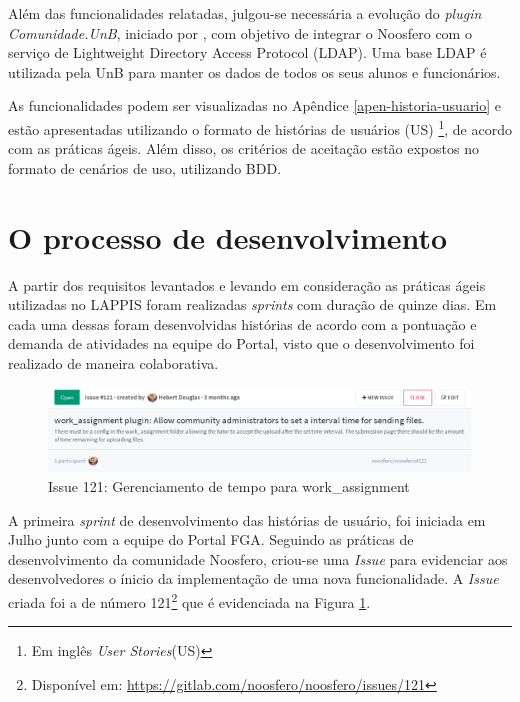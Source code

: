 Além das funcionalidades relatadas, julgou-se necessária a evolução do \textit{plugin Comunidade.UnB}, iniciado por , com objetivo de integrar o Noosfero com o serviço de Lightweight Directory Access Protocol (LDAP). Uma base LDAP é utilizada pela UnB para manter os dados de todos os seus alunos e funcionários.

As funcionalidades podem ser visualizadas no Apêndice \ref{apen-historia-usuario} e estão apresentadas utilizando o formato de histórias de usuários (US) \footnote{Em inglês \textit{User Stories}(US)}, de acordo com as práticas ágeis. Além disso, os critérios de aceitação estão expostos no formato de cenários de uso, utilizando BDD.

\section{O processo de desenvolvimento}

A partir dos requisitos levantados e levando em consideração as práticas ágeis utilizadas no LAPPIS foram realizadas \textit{sprints} com duração de quinze dias. Em cada uma dessas foram desenvolvidas histórias de acordo com a pontuação e demanda de atividades na equipe do Portal, visto que o desenvolvimento foi realizado de maneira colaborativa.

\begin{figure}[h]
    \centering
    \includegraphics[keepaspectratio=true,scale=0.4]
      {figuras/issue121.eps}
    \caption{Issue 121: Gerenciamento de tempo para work\_assignment}
    \label{fig:issue-121}
\end{figure}

A primeira \textit{sprint} de desenvolvimento das histórias de usuário, foi iniciada em Julho junto com a equipe do Portal FGA. Seguindo as práticas de desenvolvimento da comunidade Noosfero, criou-se uma \textit{Issue} para evidenciar aos desenvolvedores o ínicio da implementação de uma nova funcionalidade. A \textit{Issue} criada foi a de número 121\footnote{Disponível em: \url{https://gitlab.com/noosfero/noosfero/issues/121}} que  é evidenciada na Figura \ref{fig:issue-121}.

